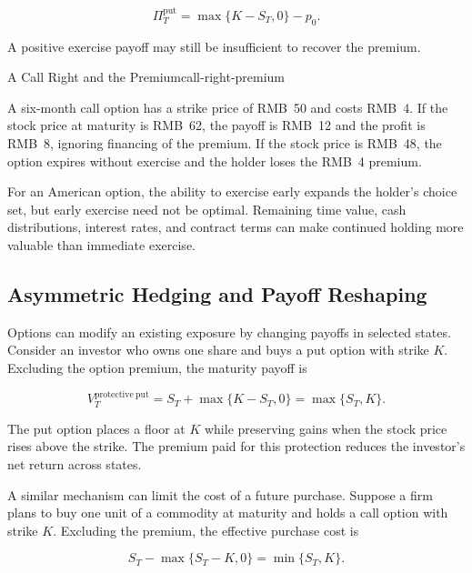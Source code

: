 \begin{equation}
\Pi_T^{\mathrm{put}}
=\max\{K-S_T,0\}-p_0.
\label{eq:ch18-put-profit}
\end{equation}

A positive exercise payoff may still be insufficient to recover the premium.

\begin{example}{A Call Right and the Premium}{call-right-premium}

A six-month call option has a strike price of RMB~50 and costs RMB~4. If the stock price at maturity is RMB~62, the payoff is RMB~12 and the profit is RMB~8, ignoring financing of the premium. If the stock price is RMB~48, the option expires without exercise and the holder loses the RMB~4 premium.

\end{example}

For an American option, the ability to exercise early expands the holder's choice set, but early exercise need not be optimal. Remaining time value, cash distributions, interest rates, and contract terms can make continued holding more valuable than immediate exercise.




\subsection{Asymmetric Hedging and Payoff Reshaping}

Options can modify an existing exposure by changing payoffs in selected states. Consider an investor who owns one share and buys a put option with strike \(K\). Excluding the option premium, the maturity payoff is

\begin{equation}
V_T^{\mathrm{protective\ put}}
=S_T+\max\{K-S_T,0\}=
\max\{S_T,K\}.
\label{eq:ch18-protective-put}
\end{equation}

The put option places a floor at \(K\) while preserving gains when the stock price rises above the strike. The premium paid for this protection reduces the investor's net return across states.

A similar mechanism can limit the cost of a future purchase. Suppose a firm plans to buy one unit of a commodity at maturity and holds a call option with strike \(K\). Excluding the premium, the effective purchase cost is

\begin{equation}
S_T-\max\{S_T-K,0\}
=\min\{S_T,K\}.
\label{eq:ch18-call-hedged-purchase}
\end{equation}

